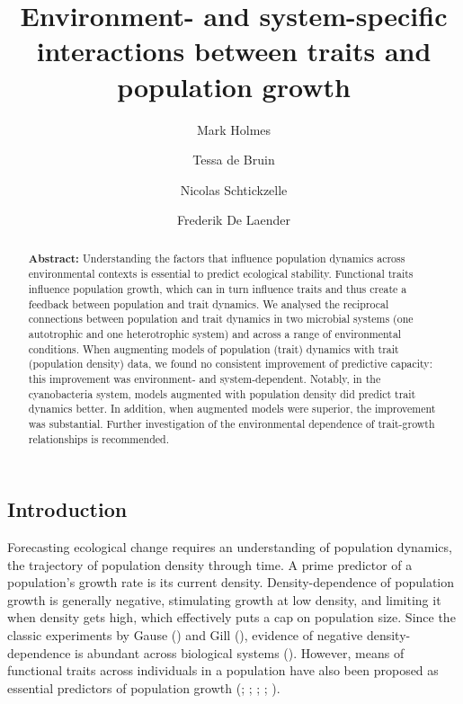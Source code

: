 \documentclass[
  letterpaper,
  DIV=11,
  numbers=noendperiod]{scrartcl}
\title{Environment- and system-specific interactions between traits and
population growth}
\author{Mark Holmes \and Tessa de Bruin \and Nicolas
Schtickzelle \and Frederik De Laender}
\date{}
\begin{document}
\maketitle
\begin{abstract}
\textbf{Abstract:} Understanding the factors that influence population
dynamics across environmental contexts is essential to predict
ecological stability. Functional traits influence population growth,
which can in turn influence traits and thus create a feedback between
population and trait dynamics. We analysed the reciprocal connections
between population and trait dynamics in two microbial systems (one
autotrophic and one heterotrophic system) and across a range of
environmental conditions. When augmenting models of population (trait)
dynamics with trait (population density) data, we found no consistent
improvement of predictive capacity: this improvement was environment-
and system-dependent. Notably, in the cyanobacteria system, models
augmented with population density did predict trait dynamics better. In
addition, when augmented models were superior, the improvement was
substantial. Further investigation of the environmental dependence of
trait-growth relationships is recommended.
\end{abstract}
\subsection{Introduction}\label{sec-DAE_introduction}

Forecasting ecological change requires an understanding of population
dynamics, the trajectory of population density through time. A prime
predictor of a population's growth rate is its current density.
Density-dependence of population growth is generally negative,
stimulating growth at low density, and limiting it when density gets
high, which effectively puts a cap on population size. Since the classic
experiments by Gause () and Gill
(), evidence of negative density-dependence
is abundant across biological systems (). However, means of functional traits across individuals in a
population have also been proposed as essential predictors of population
growth (;
;
;
;
).
\end{document}
